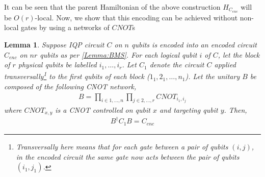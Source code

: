 \documentclass[a4paper,onecolumn,11pt,accepted=2017-05-09]{quantumarticle}
\newtheorem{lemma}[theorem]{Lemma}
\begin{document}
It can be seen that the parent Hamiltonian of the above construction $H_{C_{enc}}$ will be $O(r)$-local.
Now, we show that this encoding can be achieved without non-local gates by using a networks of $CNOT$s
\begin{lemma}\label{Lemma:CNOT}
    Suppose IQP circuit $C$ on $n$ qubits is encoded into an encoded circuit $C_{enc}$ on $nr$ qubits as per \cref{Lemma:BMS}.
    For each logical qubit $i$ of $C$, let the block of $r$ physical qubits be labelled $i_1,\ldots,i_r$. 
    Let $C_{1}$ denote the circuit $C$ applied transversally\footnote{Transversally here means that for each gate between a pair of qubits $(i,j)$, in the encoded circuit the same gate now acts between the pair of qubits $(i_1, j_1)$.} to the first qubits of each block ($1_1,2_1,\ldots,n_1$). 
    Let the unitary $B$ be composed of the following CNOT network,
\begin{align}
    B =  \prod_{i \in 1,\ldots,n}\prod_{j \in 2,\ldots,r}CNOT_{i_1,i_j}
\end{align}
    where $CNOT_{x,y}$ is a CNOT controlled on qubit $x$ and targeting qubit $y$. 
    Then,
    \begin{align}
        B^\dagger C_{1}B = C_{enc}
    \end{align}
\end{lemma}
\end{document}
